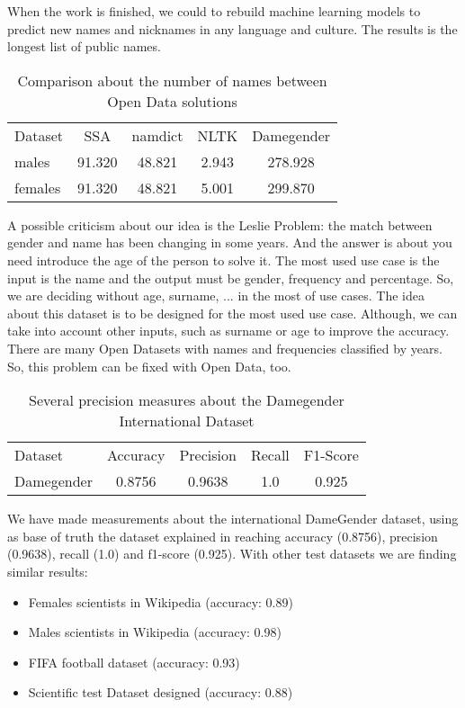 \documentclass[a4paper]{article}
\begin{document}
When the work is finished, we could to rebuild machine learning models
to predict new names and nicknames in any language and culture. The
results is the longest list of public names.

\begin{table}[t]
\footnotesize
\begin{tabular}[]{lcccc}
  \hline
  Dataset & SSA & namdict & NLTK & Damegender \tabularnewline
  males & 91.320 & 48.821 & 2.943 & 278.928 \tabularnewline
  females & 91.320 & 48.821 & 5.001 & 299.870 \tabularnewline
  \hline
\end{tabular}
\caption{Comparison about the number of names between Open Data solutions}
\label{table:DifferentNamesMeasures}
\end{table}

A possible criticism about our idea is the Leslie
Problem\cite{blevins2015jane}: the match between gender and name has
been changing in some years. And the answer is about you need
introduce the age of the person to solve it. The most used use case is
the input is the name and the output must be gender, frequency and
percentage. So, we are deciding without age, surname, ... in the most
of use cases. The idea about this dataset is to be designed for the
most used use case. Although, we can take into account other inputs,
such as surname or age to improve the accuracy. There are many Open
Datasets with names and frequencies classified by years. So, this
problem can be fixed with Open Data, too.

\begin{table}[t]
\footnotesize
\begin{tabular}[]{lcccc}
  \hline
  Dataset  & Accuracy & Precision & Recall & F1-Score  \tabularnewline
  Damegender &  0.8756  & 0.9638    & 1.0    & 0.925  \tabularnewline
  \hline
\end{tabular}
\caption{Several precision measures about the Damegender International Dataset}
\label{table:DifferentAccuracyMeasures}
\end{table}

We have made measurements about the international DameGender dataset,
using as base of truth the dataset explained in
\cite{10.7717/peerj-cs.156} reaching accuracy (0.8756), precision
(0.9638), recall (1.0) and f1-score (0.925). With other test datasets
we are finding similar results:

\begin{itemize}
\item Females scientists in Wikipedia (accuracy: 0.89)
\item Males scientists in Wikipedia (accuracy: 0.98)
\item FIFA football dataset (accuracy: 0.93)
\item Scientific test Dataset designed\cite{sebo2021performance} (accuracy: 0.88)
\end{itemize}
\end{document}
